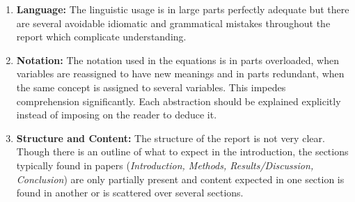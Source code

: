 \documentclass[../review.tex]{subfiles}
\begin{document}
 \textcolor{green}{\Large\checkmark}
\begin{enumerate}
 \item \textbf{Language:} The linguistic usage is in large parts perfectly adequate but there are several avoidable idiomatic and grammatical mistakes throughout the report which complicate understanding.
 \item \textbf{Notation:} The notation used in the equations is in parts overloaded, when variables are reassigned to have new meanings and in parts redundant, when the same concept is assigned to several variables. This impedes comprehension significantly. Each abstraction should be explained explicitly instead of imposing on the reader to deduce it.
 \item \textbf{Structure and Content:} The structure of the report is not very clear. Though there is an outline of what to expect in the introduction, the sections typically found in papers (\textit{Introduction, Methods, Results/Discussion, Conclusion}) are only partially present and content expected in one section is found in another or is scattered over several sections.
\end{enumerate}
\end{document}
